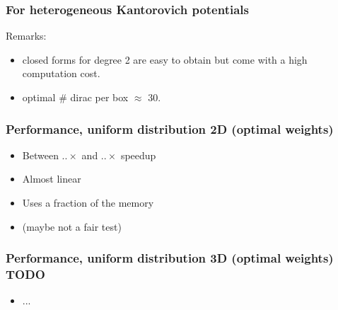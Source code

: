 \documentclass[aspectratio=169]{beamer}
\begin{document}
\begin{frame}
    \frametitle{For heterogeneous Kantorovich potentials}

    Remarks:
    \begin{itemize}
        \item closed forms for degree 2 are easy to obtain but come with a high computation cost.
        \item optimal $\#$ dirac per box $\approx$ 30.
    \end{itemize}
\end{frame}


\begin{frame}
    \frametitle{Performance, uniform distribution 2D (optimal weights)}

    \begin{minipage}[c][0.6\textheight][c]{0.55\textwidth}
        
    \end{minipage}
    \begin{minipage}[c][0.6\textheight][c]{0.4\textwidth}
        \begin{itemize}
            \item Between $..\times$ and $..\times$ speedup

            \bigskip
            \item Almost linear

            \bigskip
            \item Uses a fraction of the memory

            \bigskip
            \item (maybe not a fair test)
        \end{itemize}
    \end{minipage}
\end{frame}


\begin{frame}
    \frametitle{Performance, uniform distribution 3D (optimal weights)    TODO}

    \begin{minipage}[c][0.6\textheight][c]{0.55\textwidth}
        
    \end{minipage}
    \begin{minipage}[c][0.6\textheight][c]{0.4\textwidth}
        \begin{itemize}
            \item ...
        \end{itemize}
    \end{minipage}
\end{frame}
\end{document}
